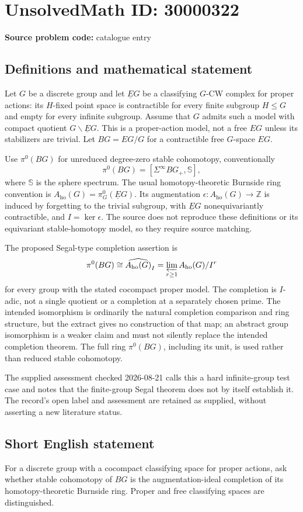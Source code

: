 \documentclass[11pt]{article}
\newcommand{\Z}{\mathbb{Z}}
\begin{document}
\section*{UnsolvedMath ID: 30000322}
\textbf{Source problem code:} catalogue entry
\subsection{Definitions and mathematical statement}
Let \(G\) be a discrete group and let \(\underline EG\) be a classifying \(G\)-CW complex for proper actions: its \(H\)-fixed point space is contractible for every finite subgroup \(H\leq G\) and empty for every infinite subgroup. Assume that \(G\) admits such a model with compact quotient \(G\backslash\underline EG\). This is a proper-action model, not a free \(EG\) unless its stabilizers are trivial. Let \(BG=EG/G\) for a contractible free \(G\)-space \(EG\).

Use \(\pi^0(BG)\) for unreduced degree-zero stable cohomotopy, conventionally
\[
\pi^0(BG)=[\Sigma^\infty BG_+,\mathbb S],
\]
where \(\mathbb S\) is the sphere spectrum. The usual homotopy-theoretic Burnside ring convention is \(A_{\mathrm{ho}}(G)=\pi_G^0(\underline EG)\). Its augmentation \(\epsilon:A_{\mathrm{ho}}(G)\to\Z\) is induced by forgetting to the trivial subgroup, with \(\underline EG\) nonequivariantly contractible, and \(I=\ker\epsilon\). The source does not reproduce these definitions or its equivariant stable-homotopy model, so they require source matching.

The proposed Segal-type completion assertion is
\[
\pi^0(BG)\cong\widehat{A_{\mathrm{ho}}(G)}_{I}
=\varprojlim_{r\geq1}A_{\mathrm{ho}}(G)/I^r
\]
for every group with the stated cocompact proper model. The completion is \(I\)-adic, not a single quotient or a completion at a separately chosen prime. The intended isomorphism is ordinarily the natural completion comparison and ring structure, but the extract gives no construction of that map; an abstract group isomorphism is a weaker claim and must not silently replace the intended completion theorem. The full ring \(\pi^0(BG)\), including its unit, is used rather than reduced stable cohomotopy.

The supplied assessment checked 2026-08-21 calls this a hard infinite-group test case and notes that the finite-group Segal theorem does not by itself establish it. The record's open label and assessment are retained as supplied, without asserting a new literature status.
\subsection{Short English statement}
For a discrete group with a cocompact classifying space for proper actions, ask whether stable cohomotopy of \(BG\) is the augmentation-ideal completion of its homotopy-theoretic Burnside ring. Proper and free classifying spaces are distinguished.
\end{document}
